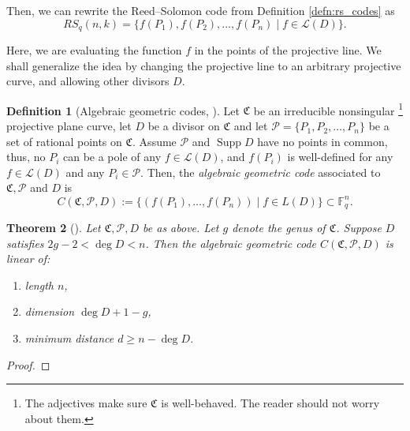 \documentclass[11pt, oneside]{amsart}
\newtheorem{thm}{Theorem}[section]
\theoremstyle{definition}
\newtheorem{defn}[thm]{Definition}
\theoremstyle{remark}
\numberwithin{equation}{section}
\DeclareMathOperator{\Supp}{Supp}
\begin{document}
Then, we can rewrite the Reed--Solomon code from Definition \ref{defn:rs_codes} as
\begin{equation}
	RS_q(n, k) = \{f(P_1), f(P_2), \dots, f(P_n) \mid f \in \mathcal L(D)\}.
\end{equation}

Here, we are evaluating the function $f$ in the points of the projective line.
We shall generalize the idea by changing the projective line to an arbitrary projective curve, and allowing other divisors $D$.

\begin{defn}[Algebraic geometric codes, \cite{LS87, Wal00}] %
	Let $\mathfrak C$ be an irreducible nonsingular%
	\footnote{The adjectives make sure $\mathfrak C$ is well-behaved. The reader should not worry about them.}
	projective plane curve, let $D$ be a divisor on $\mathfrak C$ and let $\mathcal P = \{P_1, P_2, \dots, P_n\}$ be a set of rational points on $\mathfrak C$.
	Assume $\mathcal P$ and $\Supp D$ have no points in common, thus, no $P_i$ can be a pole of any $f \in \mathcal L(D)$, and $f(P_i)$ is well-defined for any $f \in \mathcal L(D)$ and any $P_i \in \mathcal P$.
	Then, the \emph{algebraic geometric code} associated to $\mathfrak C, \mathcal P$ and $D$ is
	\begin{equation}
		C(\mathfrak C, \mathcal P, D) := \{(f(P_1), \dots, f(P_n)) \mid f \in L(D)\} \subset \mathbb{F}_q^n.
	\end{equation}
\end{defn}

\begin{thm}[\cite{Wal00}]
	Let $\mathfrak C, \mathcal P, D$ be as above. Let $g$ denote the genus of $\mathfrak C$. Suppose $D$ satisfies $2g - 2 < \deg D < n$. Then the algebraic geometric code $C(\mathfrak C, \mathcal P, D)$ is linear of:
	\begin{enumerate}[label = \textbullet, itemsep = 0pt]
		\item length $n$,
		\item dimension $\deg D + 1 - g$,
		\item minimum distance $d \ge n - \deg D$.
	\end{enumerate}
\end{thm}

\begin{proof}
\end{proof}
\end{document}
